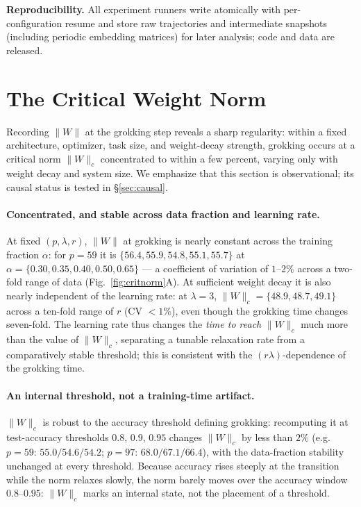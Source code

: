 \documentclass[10pt,twocolumn]{article}
\newcommand{\lam}{\lambda}
\newcommand{\Wc}{\|W\|_{c}}
\begin{document}
\textbf{Reproducibility.} All experiment runners write atomically with per-configuration resume and store
raw trajectories and intermediate snapshots (including periodic embedding matrices) for later analysis;
code and data are released.

\section{The Critical Weight Norm}
\label{sec:critnorm}
Recording $\|W\|$ at the grokking step reveals a sharp regularity: within a fixed architecture, optimizer,
task size, and weight-decay strength, grokking occurs at a critical norm $\Wc$ concentrated to within a few
percent, varying only with weight decay and system size. We emphasize that this section is observational;
its causal status is tested in \S\ref{sec:causal}.

\paragraph{Concentrated, and stable across data fraction and learning rate.}
At fixed $(p,\lam,r)$, $\|W\|$ at grokking is nearly constant across the training fraction $\alpha$: for
$p=59$ it is $\{56.4,55.9,54.8,55.1,55.7\}$ at $\alpha=\{0.30,0.35,0.40,0.50,0.65\}$ --- a coefficient of
variation of $1$--$2\%$ across a two-fold range of data (Fig.~\ref{fig:critnorm}A). At sufficient weight
decay it is also nearly independent of the learning rate: at $\lam=3$, $\Wc=\{48.9,48.7,49.1\}$ across a
ten-fold range of $r$ (CV $<1\%$), even though the grokking time changes seven-fold. The learning rate thus
changes the \emph{time to reach} $\Wc$ much more than the value of $\Wc$, separating a tunable relaxation
rate from a comparatively stable threshold; this is consistent with the $(r\lam)$-dependence of the
grokking time.

\paragraph{An internal threshold, not a training-time artifact.}
$\Wc$ is robust to the accuracy threshold defining grokking: recomputing it at test-accuracy thresholds
$0.8$, $0.9$, $0.95$ changes $\Wc$ by less than $2\%$ (e.g. $p=59\!:\,55.0/54.6/54.2$;
$p=97\!:\,68.0/67.1/66.4$), with the data-fraction stability unchanged at every threshold. Because accuracy
rises steeply at the transition while the norm relaxes slowly, the norm barely moves over the accuracy
window $0.8$--$0.95$: $\Wc$ marks an internal state, not the placement of a threshold.
\end{document}
